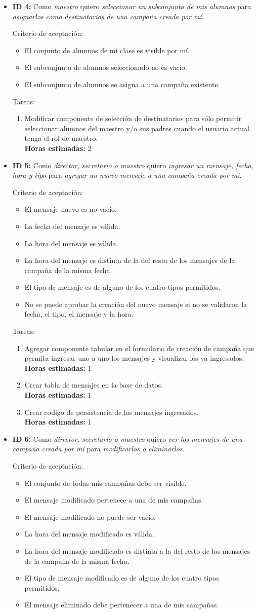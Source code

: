\documentclass[a4paper, 10pt, twoside]{article}
\newenvironment{stories}{
  \begin{itemize}
}{
  \end{itemize}
}
\newcommand{\storyid}[4]{
  \item
  \textbf{ID #1:} Como \emph{#2} quiero \emph{#3} para \emph{#4}.
}
\newenvironment{tasks}{
  Tareas:
  \begin{enumerate}
}{
  \end{enumerate}
}
\newcommand{\task}[1] {
  \item #1.\\
  \textbf{Horas estimadas:}
}
\newenvironment{criterios}{
  Criterio de aceptación:
  \begin{itemize}
}{
  \end{itemize}
}
\newcommand{\criteria}[1] {
  \item #1
}
\begin{document}
\begin{stories}
  \storyid{4}
          {maestro}
          {seleccionar un subconjunto de mis alumnos}
          {asignarlos como destinatarios de una campaña creada por mí}
            
   \begin{criterios}
  	\criteria{El conjunto de alumnos de mi clase es visible por mí.}
    \criteria{El subconjunto de alumnos seleccionado no es vacío.}
    \criteria{El subconjunto de alumnos se asigna a una campaña existente.}
  \end{criterios} 
   

  \begin{tasks}
    \task{Modificar componente de selección de destinatarios para sólo permitir seleccionar alumnos del maestro y/o sus padres cuando el usuario actual tenga el rol de maestro} 2
  \end{tasks}


  \storyid{5}{director, secretario o maestro}
             {ingresar un mensaje, fecha, hora y tipo}
             {agregar un nuevo mensaje a una campaña creada por mí}

   \begin{criterios}
  	\criteria{El mensaje nuevo es no vacío.}
    \criteria{La fecha del mensaje es válida.}
    \criteria{La hora del mensaje es válida.}
    \criteria{La hora del mensaje es distinta de la del resto de los mensajes de la campaña de la misma fecha.}
    \criteria{El tipo de mensaje es de alguno de los cuatro tipos permitidos.}
    \criteria{No se puede aprobar la creación del nuevo mensaje si no se validaron la fecha, el tipo, el mensaje y la hora.}
  \end{criterios} 
   
  \begin{tasks}
    \task{Agregar componente tabular en el formulario de creación de campaña que permita ingresar uno a uno los mensajes y visualizar los ya ingresados} 1
    \task{Crear tabla de mensajes en la base de datos} 1
    \task{Crear codigo de persistencia de los mensajes ingresados} 1
  \end{tasks}


  \storyid{6}
          {director, secretario o maestro}
          {ver los mensajes de una campaña creada por mí}
          {modificarlos o eliminarlos}

   \begin{criterios}
    \criteria{El conjunto de todas mis campañas debe ser visible.}
    \criteria{El mensaje modificado pertenece a una de mis campañas.}
  	\criteria{El mensaje modificado no puede ser vacío.}
    \criteria{La hora del mensaje modificado es válida.}
    \criteria{La hora del mensaje modificado es distinta a la del resto de los mensajes de la campaña de la misma fecha.}
    \criteria{El tipo de mensaje modificado es de alguno de los cuatro tipos permitidos.}
    \criteria{El mensaje eliminado debe pertenecer a una de mis campañas.}
  \end{criterios} 


\end{stories}
\end{document}
